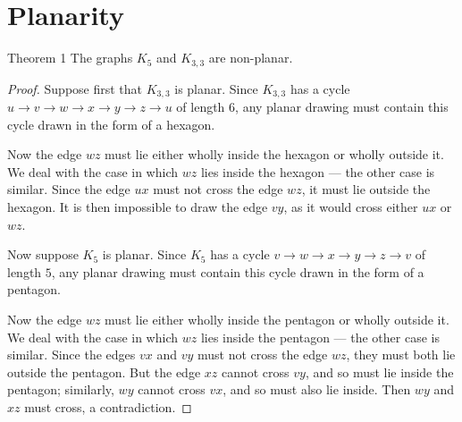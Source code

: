 \section{Planarity}

\begin{thmbox}{Theorem 1}
The graphs $K_5$ and $K_{3,3}$ are non-planar.
\end{thmbox}

\begin{proof}
Suppose first that $K_{3,3}$ is planar. Since $K_{3,3}$ has a cycle $u \to v \to w \to x \to y \to z \to u$ of length $6$, any planar drawing must contain this cycle drawn in the form of a hexagon.

Now the edge $wz$ must lie either wholly inside the hexagon or wholly outside it. We deal with the case in which $wz$ lies inside the hexagon --- the other case is similar. Since the edge $ux$ must not cross the edge $wz$, it must lie outside the hexagon. It is then impossible to draw the edge $vy$, as it would cross either $ux$ or $wz$.

\begin{center}
\end{center}

Now suppose $K_5$ is planar. Since $K_5$ has a cycle $v \to w \to x \to y \to z \to v$ of length $5$, any planar drawing must contain this cycle drawn in the form of a pentagon.

Now the edge $wz$ must lie either wholly inside the pentagon or wholly outside it. We deal with the case in which $wz$ lies inside the pentagon --- the other case is similar. Since the edges $vx$ and $vy$ must not cross the edge $wz$, they must both lie outside the pentagon. But the edge $xz$ cannot cross $vy$, and so must lie inside the pentagon; similarly, $wy$ cannot cross $vx$, and so must also lie inside. Then $wy$ and $xz$ must cross, a contradiction.


\end{proof}
